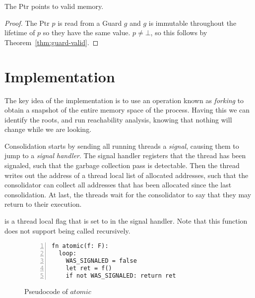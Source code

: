 \begin{lemma}\label{lm:ptr-valid}
  The Ptr points to valid memory.
\end{lemma}
\begin{proof}
The  Ptr $p$ is read from a Guard $g$ and $g$ is immutable throughout the lifetime of $p$ so they
have the same value. $p \neq \bot$, so this follows by Theorem~\ref{thm:guard-valid}.
\end{proof}




\section{Implementation}

The key idea of the implementation is to use an operation known as \emph{forking} to obtain a
snapshot of the entire memory space of the process. Having this we can identify the roots, and run
reachability analysis, knowing that nothing will change while we are looking.

Consolidation starts by sending all running threads a \emph{signal}, causing them to jump to a
\emph{signal handler}. The signal handler registers that the thread has been signaled, such that the
garbage collection pass is detectable. Then the thread writes out the address of a thread local
list of allocated addresses, such that the consolidator can collect all addresses that has been
allocated since the last consolidation. At last, the threads wait for the consolidator to say that
they may return to their execution. 


   is a thread local flag that is
  set to  in the signal handler. Note that this function does not support being called
  recursively.
\begin{figure}[ht]
  \begin{lstlisting}[numbers=left,numberstyle=\color{gray}\ttfamily{}A]
fn atomic(f: F):
  loop:
    WAS_SIGNALED = false
    let ret = f()
    if not WAS_SIGNALED: return ret
\end{lstlisting}
\caption{Pseudocode of $atomic$}
\end{figure}

